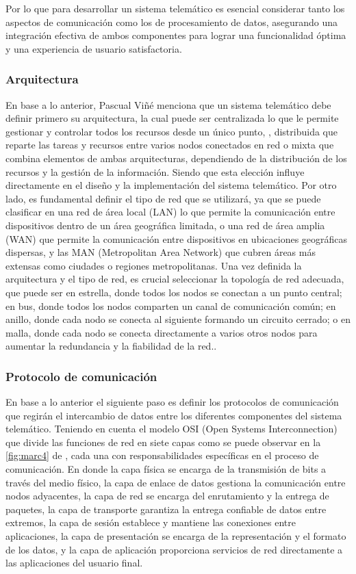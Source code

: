 Por lo que para desarrollar un sistema telemático es esencial considerar tanto los aspectos de
comunicación como los de procesamiento de datos, asegurando una integración efectiva
de ambos componentes para lograr una funcionalidad óptima y una experiencia de usuario satisfactoria.

\subsubsection{Arquitectura}
En base a lo anterior, Pascual Viñé menciona que un sistema telemático 
debe definir primero su arquitectura, la cual puede ser centralizada 
lo que le permite gestionar y controlar todos los recursos desde un único punto,
, distribuida que reparte las tareas y recursos entre varios nodos conectados en red
o mixta que combina elementos de ambas arquitecturas,
dependiendo de la distribución de los recursos y la gestión de la información.
Siendo que esta elección influye directamente en el diseño y la implementación del sistema telemático.
Por otro lado, es fundamental definir el tipo de red que se utilizará, 
ya que se puede clasificar en una red de área local (LAN) 
lo que permite la comunicación entre dispositivos dentro de un área geográfica limitada,
o una red de área amplia (WAN) que permite la comunicación entre dispositivos en ubicaciones geográficas dispersas,
y las MAN (Metropolitan Area Network) que cubren áreas más extensas como ciudades o regiones metropolitanas.\newline
Una vez definida la arquitectura y el tipo de red, es crucial seleccionar
la topología de red adecuada, que puede ser en estrella, donde todos los nodos se conectan a un
punto central; en bus, donde todos los nodos comparten un canal de comunicación común;
en anillo, donde cada nodo se conecta al siguiente formando un circuito cerrado;
o en malla, donde cada nodo se conecta directamente a varios otros nodos para
aumentar la redundancia y la fiabilidad de la red.\cite{Vine2000}.

\subsubsection{Protocolo de comunicación}
En base a lo anterior el siguiente paso es definir los protocolos de comunicación que regirán el intercambio
de datos entre los diferentes componentes del sistema telemático. 
Teniendo en cuenta el modelo OSI (Open Systems Interconnection) que divide las funciones de red en siete capas
como se puede observar en la \cref{fig:marc4} de \cite{Vine2000},
cada una con responsabilidades específicas en el proceso de comunicación.
En donde la capa física se encarga de la transmisión de bits a través del medio físico,
la capa de enlace de datos gestiona la comunicación entre nodos adyacentes,
la capa de red se encarga del enrutamiento y la entrega de paquetes,
la capa de transporte garantiza la entrega confiable de datos entre extremos,
la capa de sesión establece y mantiene las conexiones entre aplicaciones,
la capa de presentación se encarga de la representación y el formato de los datos,
y la capa de aplicación proporciona servicios de red directamente a las aplicaciones del usuario final.

